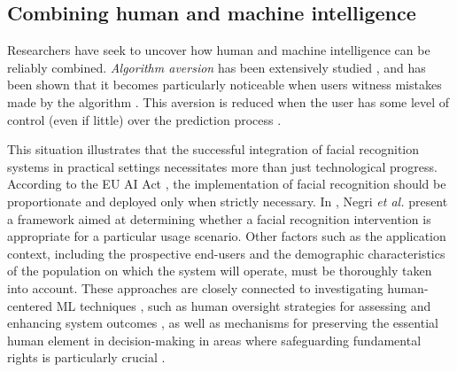 \subsection{Combining human and machine intelligence}
Researchers have seek to uncover how human and machine intelligence can be reliably combined.
%
\textit{Algorithm aversion} has been extensively studied \cite{dzindolet2002perceived,reich2023overcome}, and has been shown that it becomes particularly noticeable when users witness mistakes made by the algorithm \cite{dietvorst2015algorithm}. This aversion is reduced when the user has some level of control (even if little) over the prediction process \cite{dietvorst2018overcoming,roy2019automation}.

This situation illustrates that the successful integration of facial recognition systems in practical settings necessitates more than just technological progress. According to the EU AI Act \cite{EUAIAct}, the implementation of facial recognition should be proportionate and deployed only when strictly necessary. In \cite{negri2024framework}, Negri {\em et al.} present a framework aimed at determining whether a facial recognition intervention is appropriate for a particular usage scenario.
%
Other factors such as the application context, including the prospective end-users and the demographic characteristics of the population on which the system will operate, must be thoroughly taken into account. These approaches are closely connected to investigating human-centered ML techniques \cite{papenmeier2022accurate}, such as human oversight strategies for assessing and enhancing system outcomes \cite{hupont2022landscape,kyriakou2023humans}, as well as mechanisms for preserving the essential human element in decision-making in areas where safeguarding fundamental rights is particularly crucial \cite{koulu2020proceduralizing}. 

